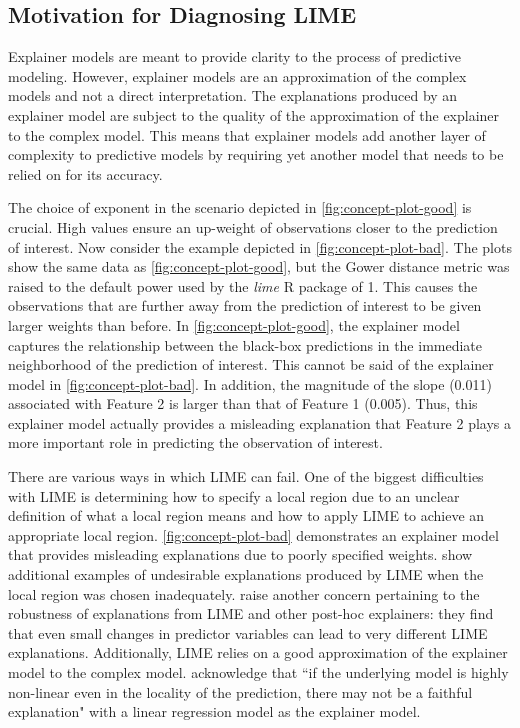 \documentclass[AMS,STIX2COL]{WileyNJD-v2}\usepackage[]{graphicx}\usepackage[]{color}
\begin{document}
\subsection{Motivation for Diagnosing LIME}

Explainer models are meant to provide clarity to the process of predictive modeling. However, explainer models are an approximation of the complex models and not a direct interpretation. The explanations produced by an explainer model are subject to the quality of the approximation of the explainer to the complex model. This means that explainer models add another layer of complexity to predictive models by requiring yet another model that needs to be relied on for its accuracy.

The choice of exponent in the scenario depicted in \autoref{fig:concept-plot-good} is crucial. High values ensure an up-weight of observations closer to the prediction of interest. Now consider the example depicted in \autoref{fig:concept-plot-bad}. The plots show the same data as \autoref{fig:concept-plot-good}, but the Gower distance metric was raised to the default power used by the \emph{lime} R package of 1. This causes the observations that are further away from the prediction of interest to be given larger weights than before. In \autoref{fig:concept-plot-good}, the explainer model captures the relationship between the black-box predictions in the immediate neighborhood of the prediction of interest. This cannot be said of the explainer model in \autoref{fig:concept-plot-bad}. In addition, the magnitude of the slope (0.011) associated with Feature 2 is larger than that of Feature 1 (0.005). Thus, this explainer model actually provides a misleading explanation that Feature 2 plays a more important role in predicting the observation of interest.

There are various ways in which LIME can fail. One of the biggest difficulties with LIME is determining how to specify a local region \citep{molnar:2019} due to an unclear definition of what a local region means and how to apply LIME to achieve an appropriate local region. \autoref{fig:concept-plot-bad} demonstrates an explainer model that provides misleading explanations due to poorly specified weights. \citet{laugel:2018} show additional examples of undesirable explanations produced by LIME when the local region was chosen inadequately. \citet{alvarezmelis:2018} raise another concern pertaining to the robustness of explanations from LIME and other post-hoc explainers: they find that even small changes in predictor variables can lead to very different LIME explanations. Additionally, LIME relies on a good approximation of the explainer model to the complex model. \citet{ribeiro:2016} acknowledge that ``if the underlying model is highly non-linear even in the locality of the prediction, there may not be a faithful explanation" with a linear regression model as the explainer model.
\end{document}
